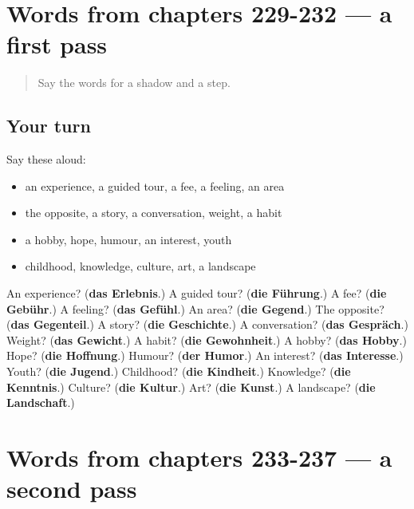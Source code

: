 \section[(dialogue)]{Words from chapters 229-232 — a first pass}

\label{lesson:GE-R237-first-pass-words-from-chapters-229-232}



\begin{quote}
Say the words for a shadow and a step.
\end{quote}

\subsection*{Your turn}
Say these aloud:

\begin{itemize}
\raggedright
  \item an experience, a guided tour, a fee, a feeling, an area
  \item the opposite, a story, a conversation, weight, a habit
  \item a hobby, hope, humour, an interest, youth
  \item childhood, knowledge, culture, art, a landscape
\end{itemize}

\begin{tcolorbox}[breakable,colback=teal!4,colframe=teal!35!black,title={Before you move on}]
An experience? (\textbf{das Erlebnis}.) A guided tour? (\textbf{die Führung}.) A fee? (\textbf{die Gebühr}.) A feeling? (\textbf{das Gefühl}.) An area? (\textbf{die Gegend}.) The opposite? (\textbf{das Gegenteil}.) A story? (\textbf{die Geschichte}.) A conversation? (\textbf{das Gespräch}.) Weight? (\textbf{das Gewicht}.) A habit? (\textbf{die Gewohnheit}.) A hobby? (\textbf{das Hobby}.) Hope? (\textbf{die Hoffnung}.) Humour? (\textbf{der Humor}.) An interest? (\textbf{das Interesse}.) Youth? (\textbf{die Jugend}.) Childhood? (\textbf{die Kindheit}.) Knowledge? (\textbf{die Kenntnis}.) Culture? (\textbf{die Kultur}.) Art? (\textbf{die Kunst}.) A landscape? (\textbf{die Landschaft}.)
\end{tcolorbox}
\section[(dialogue)]{Words from chapters 233-237 — a second pass}

\label{lesson:GE-R237-second-pass-words-from-chapters-233-237}



